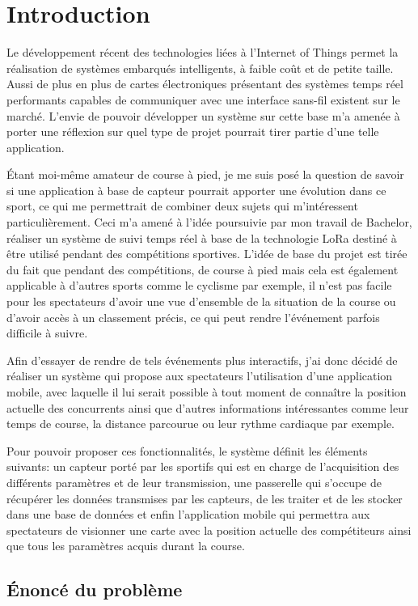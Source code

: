 \chapter{Introduction}

Le développement récent des technologies liées à l'Internet of Things permet la réalisation de systèmes embarqués intelligents, à faible coût et de petite taille. Aussi de plus en plus de cartes électroniques présentant des systèmes temps réel performants capables de communiquer avec une interface sans-fil existent sur le marché. L'envie de pouvoir développer un système sur cette base m'a amenée à porter une réflexion sur quel type de projet pourrait tirer partie d'une telle application. 

Étant moi-même amateur de course à pied, je me suis posé la question de savoir si une application à base de capteur pourrait apporter une évolution dans ce sport, ce qui me permettrait de combiner deux sujets qui m'intéressent particulièrement. Ceci m'a amené à l'idée poursuivie par mon travail de Bachelor, réaliser un système de suivi temps réel à base de la technologie LoRa destiné à être utilisé pendant des compétitions sportives. L'idée de base du projet est tirée du fait que pendant des compétitions, de course à pied mais cela est également applicable à d'autres sports comme le cyclisme par exemple, il n'est pas facile pour les spectateurs d'avoir une vue d'ensemble de la situation de la course ou d’avoir accès à un classement précis, ce qui peut rendre l'événement parfois difficile à suivre.

Afin d'essayer de rendre de tels événements plus interactifs, j'ai donc décidé de réaliser un système qui propose aux spectateurs l'utilisation d'une application mobile, avec laquelle il lui serait possible à tout moment de connaître la position actuelle des concurrents ainsi que d'autres informations intéressantes comme leur temps de course, la distance parcourue ou leur rythme cardiaque par exemple. 

Pour pouvoir proposer ces fonctionnalités, le système définit les éléments suivants: un capteur porté par les sportifs qui est en charge de l'acquisition des différents paramètres et de leur transmission, une passerelle qui s'occupe de récupérer les données transmises par les capteurs, de les traiter et de les stocker dans une base de données et enfin l'application mobile qui permettra aux spectateurs de visionner une carte avec la position actuelle des compétiteurs ainsi que tous les paramètres acquis durant la course.


\section{Énoncé du problème}

